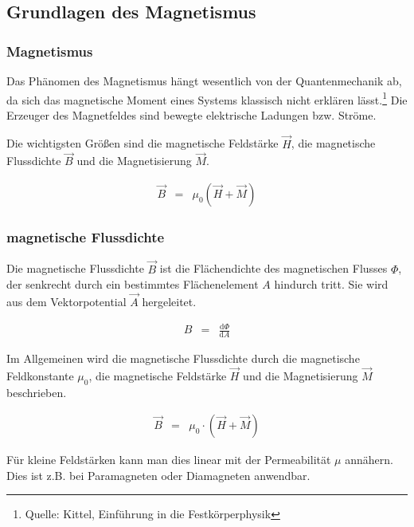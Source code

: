 \documentclass[12pt,a4paper]{scrartcl}
\numberwithin{equation}{section} %
\begin{document}
\hypertarget{grundlagen-des-magnetismus}{%
\subsection{Grundlagen des
Magnetismus}\label{grundlagen-des-magnetismus}}

\hypertarget{magnetismus}{%
\subsubsection{Magnetismus}\label{magnetismus}}

Das Phänomen des Magnetismus hängt wesentlich von der Quantenmechanik
ab, da sich das magnetische Moment eines Systems klassisch nicht
erklären lässt.\footnote{Quelle: Kittel, Einführung in die
  Festkörperphysik} Die Erzeuger des Magnetfeldes sind bewegte
elektrische Ladungen bzw. Ströme.

Die wichtigsten Größen sind die magnetische Feldstärke $\vec H$, die
magnetische Flussdichte $\vec B$ und die Magnetisierung $\vec M$.

\begin{eqnarray}
    \vec{B} &=& \mu_0
        \left(
            \vec H + \vec M
        \right)
\end{eqnarray}

\hypertarget{magnetische-flussdichte}{%
\subsubsection{magnetische Flussdichte}\label{magnetische-flussdichte}}

Die magnetische Flussdichte $\vec B$ ist die Flächendichte des magnetischen Flusses $\Phi$, der senkrecht durch ein bestimmtes Flächenelement $A$ hindurch tritt. Sie wird aus dem Vektorpotential $\vec A$ hergeleitet.

\begin{eqnarray}
    B &=& \frac{\mathrm d\Phi}{\mathrm dA}
\end{eqnarray}

Im Allgemeinen wird die magnetische Flussdichte durch die magnetische
Feldkonstante $\mu_0$, die magnetische Feldstärke $\vec H$ und die
Magnetisierung $\vec M$ beschrieben.

\begin{eqnarray}
    \vec B &=& \mu_0 \cdot \left(\vec H + \vec M\right)
\end{eqnarray}

Für kleine Feldstärken kann man dies linear mit der Permeabilität
$\mu$ annähern. Dies ist z.B. bei Paramagneten oder Diamagneten
anwendbar.
\end{document}
